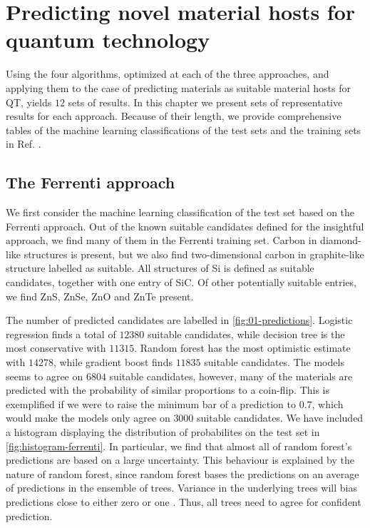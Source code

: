 \chapter{Predicting novel material hosts for quantum technology}

Using the four algorithms, optimized at each of the three approaches, and applying them to the case of predicting materials as suitable material hosts for QT, yields $12$ sets of results. In this chapter we present sets of representative results for each approach. Because of their length, we provide comprehensive tables of the machine learning classifications of the test sets and the training sets in Ref. \cite{Ohebbi2021}.

\section{The Ferrenti approach}

We first consider the machine learning classification of the test set based on the Ferrenti approach. Out of the known suitable candidates defined for the insightful approach, we find many of them in the Ferrenti training set. Carbon in diamond-like structures is present, but we also find two-dimensional carbon in graphite-like structure labelled as suitable. All structures of Si is defined as suitable candidates, together with one entry of SiC. Of other potentially suitable entries, we find ZnS, ZnSe, ZnO and ZnTe present.



The number of predicted candidates are labelled in \autoref{fig:01-predictions}. Logistic regression finds a total of $12380$ suitable candidates, while decision tree is the most conservative with $11315$. Random forest has the most optimistic estimate with $14278$, while gradient boost finds $11835$ suitable candidates. The models seems to agree on $6804$ suitable candidates, however, many of the materials are predicted with the probability of similar proportions to a coin-flip. This is exemplified if we were to raise the minimum bar of a prediction to $0.7$, which would make the models only agree on $3000$ suitable candidates. We have included a histogram displaying the distribution of probabilites on the test set in \autoref{fig:histogram-ferrenti}.
In particular, we find that almost all of random forest's predictions are based on a large uncertainty. This behaviour is explained by the nature of random forest, since random forest bases the predictions on an average of predictions in the ensemble of trees. Variance in the underlying trees will bias predictions close to either zero or one \cite{NiculescuMizil2005}. Thus, all trees need to agree for confident prediction.

